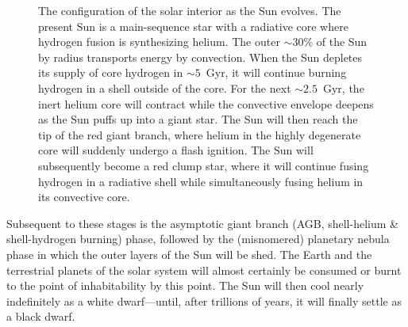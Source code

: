 \begin{figure}
      \caption[Configurations of the solar interior]{The configuration of the solar interior as the Sun evolves. 
    The present Sun is a main-sequence star with a radiative core where hydrogen fusion is synthesizing helium. 
    The outer ${\sim 30\%}$ of the Sun by radius transports energy by convection. 
    When the Sun depletes its supply of core hydrogen in ${\sim 5}$~Gyr, it will continue burning hydrogen in a shell outside of the core. 
    For the next ${\sim 2.5}$~Gyr, the inert helium core will contract while the convective envelope deepens as the Sun puffs up into a giant star. 
    The Sun will then reach the tip of the red giant branch, where helium in the highly degenerate core will suddenly undergo a flash ignition. 
    The Sun will subsequently become a red clump star, where it will continue fusing hydrogen in a radiative shell while simultaneously fusing helium in its convective core. 
    \label{fig:config}}
\end{figure}

Subsequent to these stages is the asymptotic giant branch (AGB, shell-helium \& shell-hydrogen burning) phase, followed by the (misnomered) planetary nebula phase in which the outer layers of the Sun will be shed. 
The Earth and the terrestrial planets of the solar system will almost certainly be consumed or burnt to the point of inhabitability by this point. 
The Sun will then cool nearly indefinitely as a white dwarf---until, after trillions of years, it will finally settle as a black dwarf. 

